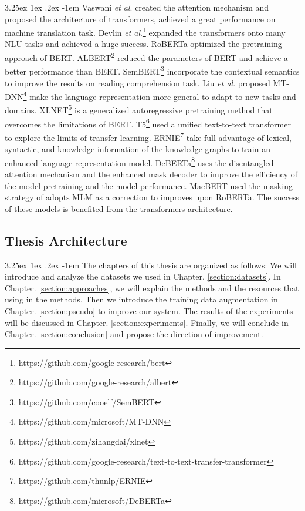 \documentclass[12pt]{article}
\makeatletter
\renewcommand\paragraph{\@startsection{paragraph}{5}{\z@}%
  {3.25ex \@plus1ex \@minus.2ex}%
  {-1em}%
  {\normalfont\normalsize\bfseries}}
\makeatother
\begin{document}
\begin{CJK*}{UTF8}{bkai}
\begin{spacing}{1.77}
\paragraph{}
Vaswani \emph{et al}. \cite{vaswani2017attention} created the attention mechanism and proposed the architecture of transformers, achieved a great performance on machine translation task. Devlin \emph{et al}.\footnote{https://github.com/google-research/bert} \cite{devlin2018bert} expanded the transformers onto many NLU tasks and achieved a huge success. RoBERTa \cite{liu2019roberta} optimized the pretraining approach of BERT. ALBERT\footnote{https://github.com/google-research/albert} \cite{lan2020albert} reduced the parameters of BERT and achieve a better performance than BERT. SemBERT\footnote{https://github.com/cooelf/SemBERT} \cite{zhang2020sembert} incorporate the contextual semantics to improve the results on reading comprehension task. Liu \emph{et al}. \cite{liu2019mtdnn} proposed MT-DNN\footnote{https://github.com/microsoft/MT-DNN} make the language representation more general to adapt to new tasks and domains. XLNET\footnote{https://github.com/zihangdai/xlnet} \cite{yang2020xlnet} is a generalized autoregressive pretraining method that overcomes the limitations of BERT. T5\footnote{https://github.com/google-research/text-to-text-transfer-transformer} \cite{raffel2020t5} used a unified text-to-text transformer to explore the limits of transfer learning. ERNIE\footnote{https://github.com/thunlp/ERNIE} \cite{zhang2019ernie} take full advantage of lexical, syntactic, and knowledge information of the knowledge graphs to train an enhanced language representation model. DeBERTa\footnote{https://github.com/microsoft/DeBERTa} \cite{he2021deberta} uses the disentangled attention mechanism and the enhanced mask decoder to improve the efficiency of the model pretraining and the model performance. MacBERT \cite{Cui_2020} used the masking strategy of adopts MLM as a correction to improves upon RoBERTa. The success of these models is benefited from the transformers architecture.

\subsection{Thesis Architecture}
\paragraph{}
The chapters of this thesis are organized as follows: We will introduce and analyze the datasets we used in Chapter. \ref{section:datasets}. In Chapter. \ref{section:approaches}, we will explain the methods and the resources that using in the methods. Then we introduce the training data augmentation in Chapter. \ref{section:pseudo} to improve our system. The results of the experiments will be discussed in Chapter. \ref{section:experiments}. Finally, we will conclude in Chapter. \ref{section:conclusion} and propose the direction of improvement.


\end{spacing}
\end{CJK*}
\end{document}
